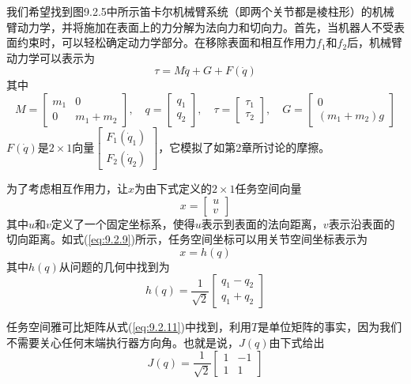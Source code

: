 \documentclass[12pt,a4paper]{ctexart}
\begin{document}
我们希望找到图9.2.5中所示笛卡尔机械臂系统（即两个关节都是棱柱形）的机械臂动力学，并将施加在表面上的力分解为法向力和切向力。首先，当机器人不受表面约束时，可以轻松确定动力学部分。在移除表面和相互作用力$f_1$和$f_2$后，机械臂动力学可以表示为
\begin{equation}
\tau = M\ddot{q} + G + F(\dot{q})
\end{equation}
其中
\[
M = \begin{bmatrix} m_1 & 0 \\ 0 & m_1 + m_2 \end{bmatrix}, \quad q = \begin{bmatrix} q_1 \\ q_2 \end{bmatrix}, \quad \tau = \begin{bmatrix} \tau_1 \\ \tau_2 \end{bmatrix}, \quad G = \begin{bmatrix} 0 \\ (m_1+m_2)g \end{bmatrix}
\]
$F(\dot{q})$是$2 \times 1$向量$\begin{bmatrix} F_1(\dot{q}_1) \\ F_2(\dot{q}_2) \end{bmatrix}$，它模拟了如第2章所讨论的摩擦。

为了考虑相互作用力，让$x$为由下式定义的$2 \times 1$任务空间向量
\begin{equation}
x = \begin{bmatrix} u \\ v \end{bmatrix}
\end{equation}
其中$u$和$v$定义了一个固定坐标系，使得$u$表示到表面的法向距离，$v$表示沿表面的切向距离。如式(\ref{eq:9.2.9})所示，任务空间坐标可以用关节空间坐标表示为
\begin{equation}
x = h(q)
\end{equation}
其中$h(q)$从问题的几何中找到为
\begin{equation}
h(q) = \frac{1}{\sqrt{2}} \begin{bmatrix} q_1 - q_2 \\ q_1 + q_2 \end{bmatrix}
\end{equation}

任务空间雅可比矩阵从式(\ref{eq:9.2.11})中找到，利用$T$是单位矩阵的事实，因为我们不需要关心任何末端执行器方向角。也就是说，$J(q)$由下式给出
\begin{equation}
J(q) = \frac{1}{\sqrt{2}} \begin{bmatrix} 1 & -1 \\ 1 & 1 \end{bmatrix}
\end{equation}
\end{document}
